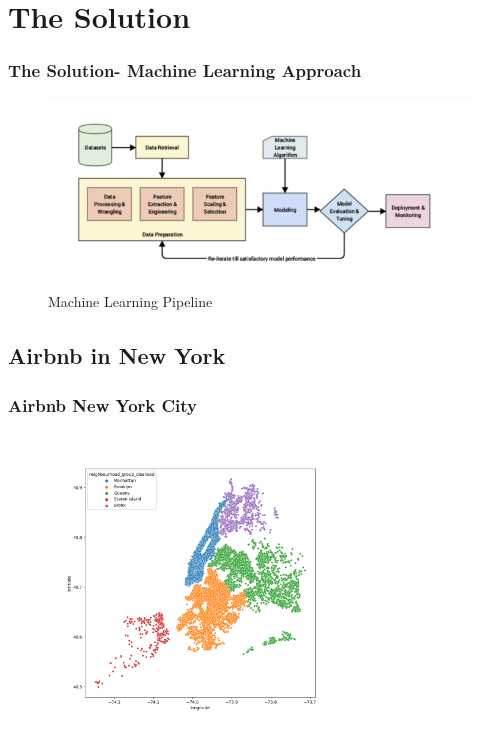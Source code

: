 \documentclass{beamer}
\begin{document}
\section{The Solution}

\begin{frame}
  \frametitle{The Solution- Machine Learning Approach}
  \begin{figure}
  \centering
  \includegraphics[scale=0.5]{figures/ml-pipeline.png}
  \caption{Machine Learning Pipeline}
  \end{figure}

\end{frame}

\subsection{Airbnb in New York}

\begin{frame}
  \frametitle{Airbnb New York City}

  \begin{figure}
  \centering
  \includegraphics[width=0.7\textwidth]{figures/airbnb-map.png}
\end{figure}

\end{frame}
\end{document}
